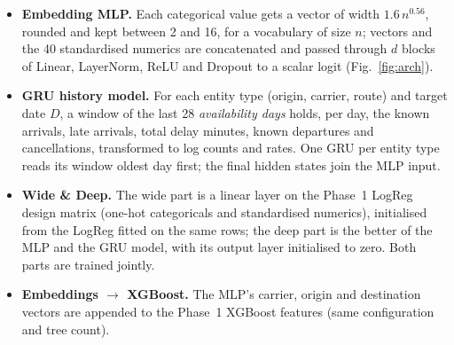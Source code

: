 \documentclass[conference]{IEEEtran}
\begin{document}
\begin{itemize}
\item \textbf{Embedding MLP.} Each categorical value gets a vector of width $1.6\,n^{0.56}$, rounded and kept between 2 and 16, for a vocabulary of size $n$; vectors and the 40 standardised numerics are concatenated and passed through $d$ blocks of Linear, LayerNorm, ReLU and Dropout to a scalar logit (Fig.~\ref{fig:arch}).
\item \textbf{GRU history model.} For each entity type (origin, carrier, route) and target date $D$, a window of the last 28 \emph{availability days} holds, per day, the known arrivals, late arrivals, total delay minutes, known departures and cancellations, transformed to log counts and rates. One GRU per entity type reads its window oldest day first; the final hidden states join the MLP input.
\item \textbf{Wide \& Deep.} The wide part is a linear layer on the Phase~1 LogReg design matrix (one-hot categoricals and standardised numerics), initialised from the LogReg fitted on the same rows; the deep part is the better of the MLP and the GRU model, with its output layer initialised to zero. Both parts are trained jointly.
\item \textbf{Embeddings $\rightarrow$ XGBoost.} The MLP's carrier, origin and destination vectors are appended to the Phase~1 XGBoost features (same configuration and tree count).
\end{itemize}

\end{document}
